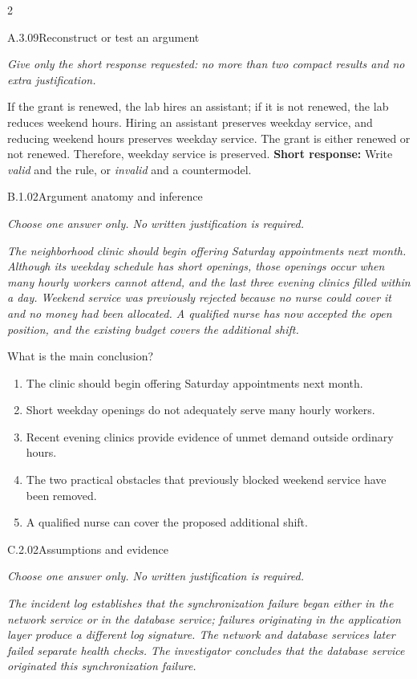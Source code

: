 \documentclass[9pt]{extarticle}
\newcommand{\choice}[1]{\item #1}
\begin{document}
\CoreWorkArea
\FormBreak
{}
\begin{multicols}{2}
\begin{DenseCoreProblem}{A.3.09}{Reconstruct or test an argument}
{\scriptsize\textit{Give only the short response requested: no more than two compact results and no extra justification.}\par}
If the grant is renewed, the lab hires an assistant; if it is not renewed, the lab reduces weekend hours. Hiring an assistant preserves weekday service, and reducing weekend hours preserves weekday service. The grant is either renewed or not renewed. Therefore, weekday service is preserved.
\textbf{Short response:} Write \emph{valid} and the rule, or \emph{invalid} and a countermodel.
\end{DenseCoreProblem}
\begin{DenseCoreProblem}{B.1.02}{Argument anatomy and inference}
{\scriptsize\textit{Choose one answer only. No written justification is required.}\par}
\emph{The neighborhood clinic should begin offering Saturday appointments next month. Although its weekday schedule has short openings, those openings occur when many hourly workers cannot attend, and the last three evening clinics filled within a day. Weekend service was previously rejected because no nurse could cover it and no money had been allocated. A qualified nurse has now accepted the open position, and the existing budget covers the additional shift.}

What is the main conclusion?
\begin{enumerate}[label=(\alph*)]
  \choice{The clinic should begin offering Saturday appointments next month.}
  \choice{Short weekday openings do not adequately serve many hourly workers.}
  \choice{Recent evening clinics provide evidence of unmet demand outside ordinary hours.}
  \choice{The two practical obstacles that previously blocked weekend service have been removed.}
  \choice{A qualified nurse can cover the proposed additional shift.}
\end{enumerate}
\end{DenseCoreProblem}
\columnbreak
\begin{DenseCoreProblem}{C.2.02}{Assumptions and evidence}
{\scriptsize\textit{Choose one answer only. No written justification is required.}\par}
\emph{The incident log establishes that the synchronization failure began either in the network service or in the database service; failures originating in the application layer produce a different log signature. The network and database services later failed separate health checks. The investigator concludes that the database service originated this synchronization failure.}


\end{DenseCoreProblem}
\end{multicols}
\end{document}
